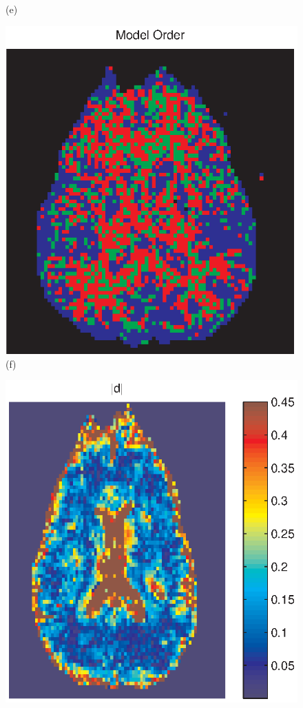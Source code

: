 \documentclass[authoryear,preprint,12pt]{elsarticle}
\begin{document}
\begin{figure}[p]
\begin{center}
\begin{minipage}[]{.30\textwidth}
       (e)
      \end{minipage}
      \begin{minipage}[]{.30\textwidth}
      \centering
      \includegraphics[width=\textwidth]{modelorderchosen2ba.eps}
       (f)
      \end{minipage}
      \begin{minipage}[]{.30\textwidth}
      \centering
      \includegraphics[width=\textwidth]{absdll2.eps}

\end{minipage}
\end{center}
\end{figure}
\end{document}
